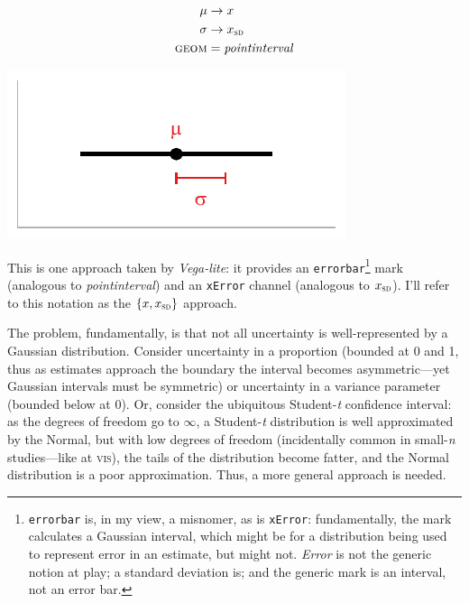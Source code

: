 \documentclass[journal]{vgtc}                     %
\begin{document}
\noindent
\begin{minipage}{.5\columnwidth}
\begin{align*}
\mu &\rightarrow x\\
\sigma &\rightarrow x_\textsc{sd}\\
\textsc{geom} &= \mathit{pointinterval}
\end{align*}
  \end{minipage}%
  \begin{minipage}{.4\columnwidth}
    \centering
    \includegraphics[width=1.2\columnwidth]{figs/2-mean_sd_interval.pdf}
  \end{minipage}

This is one approach taken by \textit{Vega-lite}: it provides an \texttt{errorbar}\footnote{\label{foot:errorbar}\texttt{errorbar} is, in my view, a misnomer, as is \texttt{xError}: fundamentally, the mark calculates a Gaussian interval, which might be for a distribution being used to represent error in an estimate, but might not. \textit{Error} is not the generic notion at play; a standard deviation is; and the generic mark is an interval, not an error bar.} mark (analogous to \textit{pointinterval}) and an \texttt{xError}  channel (analogous to $x_\textsc{sd}$). I'll refer to this notation as the $\{x, x_\textsc{sd}\}$ approach.

The problem, fundamentally, is that not all uncertainty is well-represented by a Gaussian distribution. Consider uncertainty in a proportion (bounded at 0 and 1, thus as estimates approach the boundary the interval becomes asymmetric---yet Gaussian intervals must be symmetric) or uncertainty in a variance parameter (bounded below at 0). Or, consider the ubiquitous Student-\textit{t} confidence interval: as the degrees of freedom go to $\infty$, a Student-\textit{t} distribution is well approximated by the Normal, but with low degrees of freedom (incidentally common in small-\textit{n} studies---like at \textsc{vis}), the tails of the distribution become fatter, and the Normal distribution is a poor approximation. Thus, a more general approach is needed.
\end{document}
